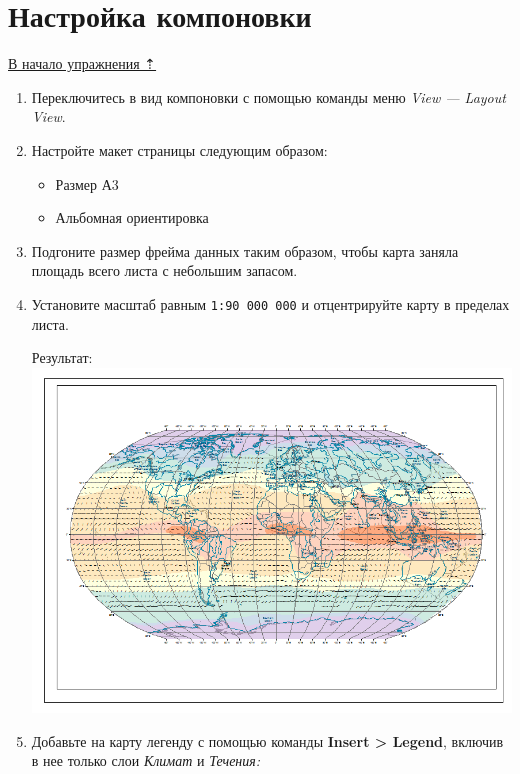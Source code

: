 \documentclass[]{book}
\providecommand{\tightlist}{%
  \setlength{\itemsep}{0pt}\setlength{\parskip}{0pt}}
\theoremstyle{definition}
\theoremstyle{definition}
\theoremstyle{definition}
\theoremstyle{remark}
\begin{document}
\hypertarget{map-design-climates-layout}{%
\section{Настройка компоновки}\label{map-design-climates-layout}}

\protect\hyperlink{map-design-climates}{В начало упражнения ⇡}

\begin{enumerate}
\def\labelenumi{\arabic{enumi}.}
\item
  Переключитесь в вид компоновки с помощью команды меню \emph{View ---
  Layout View}.
\item
  Настройте макет страницы следующим образом:

  \begin{itemize}
  \tightlist
  \item
    Размер А3
  \item
    Альбомная ориентировка
  \end{itemize}
\item
  Подгоните размер фрейма данных таким образом, чтобы карта заняла
  площадь всего листа с небольшим запасом.
\item
  Установите масштаб равным \texttt{1:90\ 000\ 000} и отцентрируйте
  карту в пределах листа.

  Результат: \includegraphics{images/Ex01/image30.png}
\item
  Добавьте на карту легенду с помощью команды \textbf{Insert
  \textgreater{} Legend}, включив в нее только слои \emph{Климат} и
  \emph{Течения:}


\end{enumerate}
\end{document}
